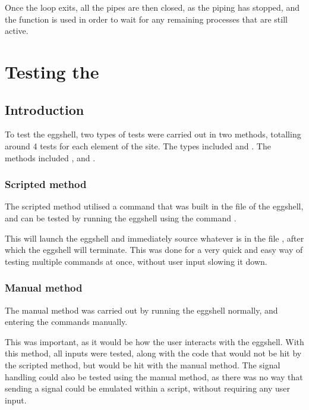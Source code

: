 \documentclass[12pt, a4paper]{report}
\begin{document}
                Once the loop exits, all the pipes are then closed, as the piping has stopped, and
                the  function is used in order to wait for any remaining processes that are
                still active.

    \chapter{Testing the }
        \section{Introduction}
            To test the eggshell, two types of tests were carried out 
            in two methods, totalling around 4 tests for each element of
            the site. The types included  and .
            The methods included , and .

            \subsection{Scripted method}
                The scripted method utilised a command that was built in
                the  file of the eggshell, and can be tested by
                running the eggshell using the command .

                This will launch the eggshell and immediately source whatever
                is in the file , after which the eggshell
                will terminate. This was done for a very quick and easy way
                of testing multiple commands at once, without user input slowing
                it down. 

            \subsection{Manual method}
                The manual method was carried out by running the eggshell 
                normally, and entering the commands manually. 

                This was important, as it would be how the user interacts 
                with the eggshell. With this method, all inputs were tested,
                along with the code that would not be hit by the scripted 
                method, but would be hit with the manual method. The signal
                handling could also be tested using the manual method, as 
                there was no way that sending a signal could be emulated 
                within a script, without requiring any user input.
\end{document}
